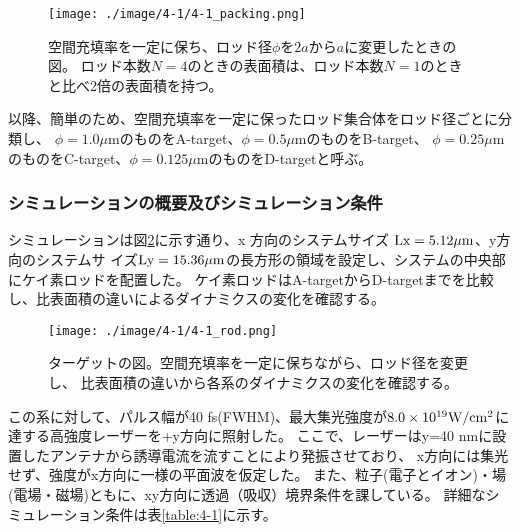 \documentclass[a4paper,11pt,titlepage]{jsarticle}
\begin{document}
    \begin{figure}[H]
      \begin{center}
        \texttt{[image: ./image/4-1/4-1\_packing.png]}
        \label{}
        \caption{
            空間充填率を一定に保ち、ロッド径$\phi$を$2a$から$a$に変更したときの図。
            ロッド本数$N=4$のときの表面積は、ロッド本数$N=1$のときと比べ2倍の表面積を持つ。
        }
      \end{center}
    \end{figure}
    以降、簡単のため、空間充填率を一定に保ったロッド集合体をロッド径ごとに分類し、
    $\phi=1.0\mu$mのものをA-target、$\phi=0.5\mu$mのものをB-target、
    $\phi=0.25\mu$mのものをC-target、$\phi=0.125\mu$mのものをD-targetと呼ぶ。
    
    \subsubsection{シミュレーションの概要及びシミュレーション条件}
    シミュレーションは図\ref{fig:4-1_rod}に示す通り、x 方向のシステムサイズ $\rm{Lx = 5.12 \mu m}$、y方向のシステムサ
    イズ$\rm{Ly = 15.36 \mu m}$の長方形の領域を設定し、システムの中央部にケイ素ロッドを配置した。
    ケイ素ロッドはA-targetからD-targetまでを比較し、比表面積の違いによるダイナミクスの変化を確認する。
    \begin{figure}[H]
      \begin{center}
        \texttt{[image: ./image/4-1/4-1\_rod.png]}
        \caption{
          \label{fig:4-1_rod}
            ターゲットの図。空間充填率を一定に保ちながら、ロッド径を変更し、
            比表面積の違いから各系のダイナミクスの変化を確認する。
        }
      \end{center}
    \end{figure}
    この系に対して、パルス幅が40 fs(FWHM)、最大集光強度が$8.0 \times 10^{19} \rm W/cm^2$に達する高強度レーザーを+y方向に照射した。
    ここで、レーザーはy=40 nmに設置したアンテナから誘導電流を流すことにより発振させており、
    x方向には集光せず、強度がx方向に一様の平面波を仮定した。
    また、粒子(電子とイオン)・場(電場・磁場)ともに、xy方向に透過（吸収）境界条件を課している。
    詳細なシミュレーション条件は表\ref{table:4-1}に示す。
\end{document}
